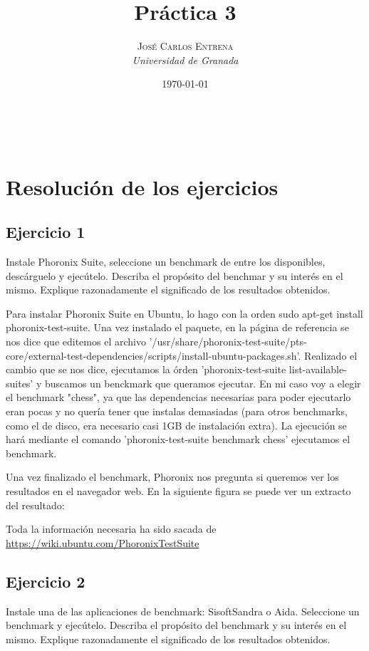 \documentclass[a4paper, 11pt]{article} %
\title{\textbf{Práctica 3}\\ %
} %
\author{\textsc{José Carlos Entrena} %
\\{\textit{Universidad de Granada}}} %
\date{\today} %
\makeatletter
\renewcommand{\maketitle}{ %
\begin{flushright} %
{\LARGE\@title} %

\vspace{60pt} %

{\large\@author} %
\\\@date %

\vspace{40pt} %
\end{flushright}
}
\makeatother
\begin{document}
\maketitle %

{\parskip=2pt
  \tableofcontents
}   %

\pagebreak %

\section{Resolución de los ejercicios}

\subsection{Ejercicio 1}
Instale Phoronix Suite, seleccione un benchmark de entre los disponibles, descárguelo y ejecútelo. Describa el propósito del benchmar y su interés en el mismo. Explique razonadamente el significado de los resultados obtenidos. 

Para instalar Phoronix Suite en Ubuntu, lo hago con la orden sudo apt-get install phoronix-test-suite. Una vez instalado el paquete, en la página de referencia se nos dice que editemos el archivo '/usr/share/phoronix-test-suite/pts-core/external-test-dependencies/scripts/install-ubuntu-packages.sh'. Realizado el cambio que se nos dice, ejecutamos la órden 'phoronix-test-suite list-available-suites' y buscamos un benckmark que queramos ejecutar. En mi caso voy a elegir el benchmark "chess", ya que las dependencias necesarias para poder ejecutarlo eran pocas y no quería tener que instalas demasiadas (para otros benchmarks, como el de disco, era necesario casi 1GB de instalación extra). La ejecución se hará mediante el comando 'phoronix-test-suite benchmark chess' ejecutamos el benchmark. 

Una vez finalizado el benchmark, Phoronix nos pregunta si queremos ver los resultados en el navegador web. En la siguiente figura se puede ver un extracto del resultado: 

Toda la información necesaria ha sido sacada de \url{https://wiki.ubuntu.com/PhoronixTestSuite}

\subsection{Ejercicio 2}
Instale una de las aplicaciones de benchmark: SisoftSandra o Aida. Seleccione un benchmark y ejecútelo. Describa el propósito del benchmark y su interés en el mismo. Explique razonadamente el significado de los resultados obtenidos. 
\end{document}
